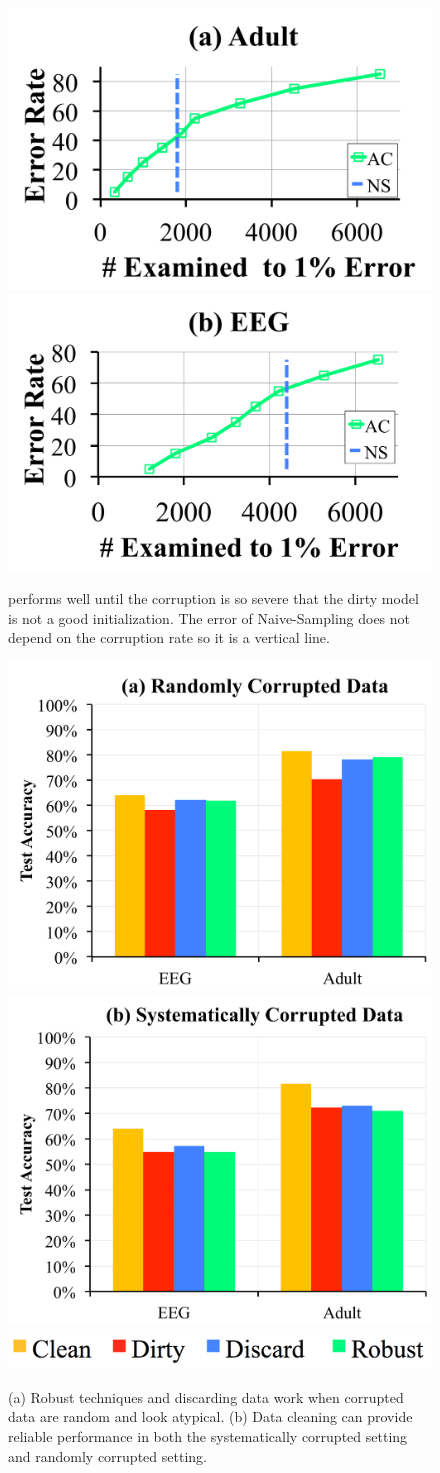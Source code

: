 \begin{figure}[t]
\centering
 \includegraphics[width=0.49\columnwidth]{exp/exp9a.pdf}
  \includegraphics[width=0.49\columnwidth]{exp/exp9b.pdf}\vspace{-1em}
 \caption{\sys performs well until the corruption is so severe that the dirty model is not a good initialization. The error of Naive-Sampling does not depend on the corruption rate so it is a vertical line.  \label{bias}}
\end{figure}

\begin{figure}[t]
\centering
 \includegraphics[width=0.49\columnwidth]{exp/exp2.pdf}
 \includegraphics[width=0.49\columnwidth]{exp/exp1.pdf}
 \includegraphics[width=0.5\columnwidth]{exp/legend-1.png}
 \caption{(a) Robust techniques and discarding data work when corrupted data are random and look atypical. (b) Data cleaning can provide reliable performance in both the systematically corrupted setting and randomly corrupted setting.\label{sys-rand}}
\end{figure}

